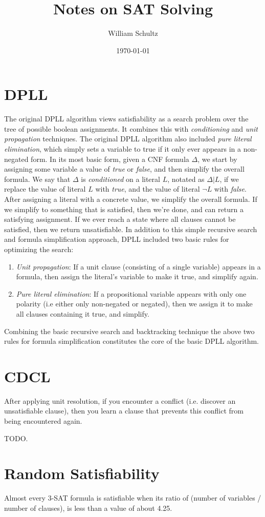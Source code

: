 \documentclass[12pt]{article}
\begin{document}
\title{Notes on SAT Solving}
\author{William Schultz}
\date{\today}

\maketitle

\section{DPLL}

The original DPLL algorithm views satisfiability as a search problem over the tree of possible boolean assignments. It combines this with \textit{conditioning} and \textit{unit propagation} techniques. The original DPLL algorithm also included \textit{pure literal elimination}, which simply sets a variable to true if it only ever appears in a non-negated form. In its most basic form, given a CNF formula $\Delta$, we start by assigning some variable a value of \textit{true} or \textit{false}, and then simplify the overall formula. We say that $\Delta$ is \textit{conditioned} on a literal $L$, notated as $\Delta|L$, if we replace the value of literal $L$ with \textit{true}, and the value of literal $\neg L$ with \textit{false}. After assigning a literal with a concrete value, we simplify the overall formula. If we simplify to something that is satisfied, then we're done, and can return a satisfying assignment. If we ever reach a state where all clauses cannot be satisfied, then we return unsatisfiable. In addition to this simple recursive search and formula simplification approach, DPLL included two basic rules for optimizing the search:
\begin{enumerate}
    \item \textit{Unit propagation}: If a unit clause (consisting of a single variable) appears in a formula, then assign the literal's variable to make it true, and simplify again.
    \item \textit{Pure literal elimination}: If a propositional variable appears with only one polarity (i.e either only non-negated or negated), then we assign it to make all clauses containing it true, and simplify.
\end{enumerate}
Combining the basic recursive search and backtracking technique the above two rules for formula simplification constitutes the core of the basic DPLL algorithm.

\section{CDCL}

After applying unit resolution, if you encounter a conflict (i.e. discover an unsatisfiable clause), then you learn a clause that prevents this conflict from being encountered again.

TODO.

\section{Random Satisfiability}

Almost every 3-SAT formula is satisfiable when its ratio of (number of variables / number of clauses), is less than a value of about 4.25.
\end{document}

